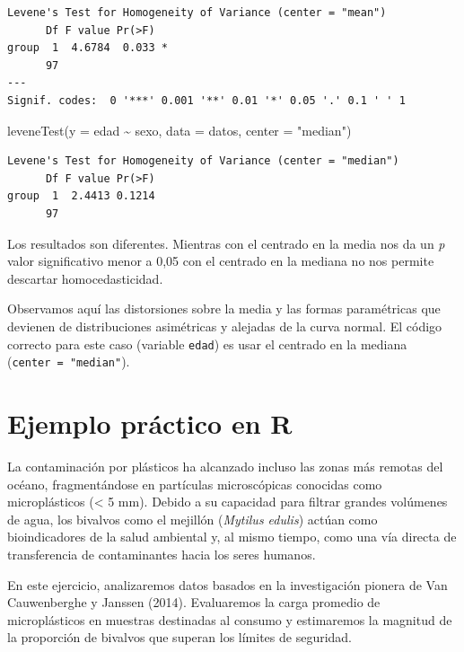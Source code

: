 \documentclass[
  spanish,
  a4paper,
]{scrbook}
\newenvironment{Shaded}{\begin{snugshade}}{\end{snugshade}}
\newcommand{\AttributeTok}[1]{\textcolor[rgb]{0.40,0.45,0.13}{#1}}
\newcommand{\FunctionTok}[1]{\textcolor[rgb]{0.28,0.35,0.67}{#1}}
\newcommand{\NormalTok}[1]{\textcolor[rgb]{0.00,0.23,0.31}{#1}}
\newcommand{\SpecialCharTok}[1]{\textcolor[rgb]{0.37,0.37,0.37}{#1}}
\newcommand{\StringTok}[1]{\textcolor[rgb]{0.13,0.47,0.30}{#1}}
\begin{document}
\begin{verbatim}
Levene's Test for Homogeneity of Variance (center = "mean")
      Df F value Pr(>F)  
group  1  4.6784  0.033 *
      97                 
---
Signif. codes:  0 '***' 0.001 '**' 0.01 '*' 0.05 '.' 0.1 ' ' 1
\end{verbatim}

\begin{Shaded}
\begin{Highlighting}[]
\FunctionTok{leveneTest}\NormalTok{(}\AttributeTok{y =}\NormalTok{ edad }\SpecialCharTok{\textasciitilde{}}\NormalTok{ sexo, }\AttributeTok{data =}\NormalTok{ datos, }\AttributeTok{center =} \StringTok{"median"}\NormalTok{)}
\end{Highlighting}
\end{Shaded}

\begin{verbatim}
Levene's Test for Homogeneity of Variance (center = "median")
      Df F value Pr(>F)
group  1  2.4413 0.1214
      97               
\end{verbatim}

Los resultados son diferentes. Mientras con el centrado en la media nos
da un \emph{p} valor significativo menor a 0,05 con el centrado en la
mediana no nos permite descartar homocedasticidad.

Observamos aquí las distorsiones sobre la media y las formas
paramétricas que devienen de distribuciones asimétricas y alejadas de la
curva normal. El código correcto para este caso (variable \texttt{edad})
es usar el centrado en la mediana (\texttt{center\ =\ "median"}).

\section{Ejemplo práctico en R}\label{ejemplo-pruxe1ctico-en-r-1}

La contaminación por plásticos ha alcanzado incluso las zonas más
remotas del océano, fragmentándose en partículas microscópicas conocidas
como microplásticos (\textless{} 5 mm). Debido a su capacidad para
filtrar grandes volúmenes de agua, los bivalvos como el mejillón
(\emph{Mytilus edulis}) actúan como bioindicadores de la salud ambiental
y, al mismo tiempo, como una vía directa de transferencia de
contaminantes hacia los seres humanos.

En este ejercicio, analizaremos datos basados en la investigación
pionera de Van Cauwenberghe y Janssen (2014). Evaluaremos la carga
promedio de microplásticos en muestras destinadas al consumo y
estimaremos la magnitud de la proporción de bivalvos que superan los
límites de seguridad.
\end{document}
